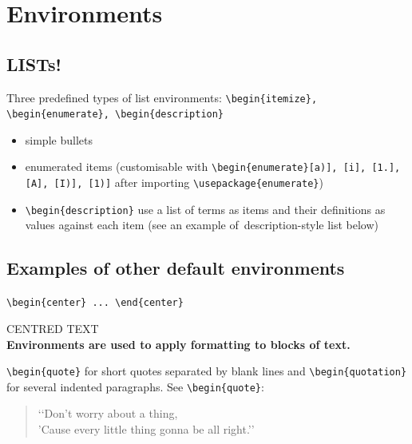 \documentclass[a4paper,11pt]{article}
\begin{document}
\section{Environments}

\subsection{LISTs!}

Three predefined types of list environments: \verb|\begin{itemize}, \begin{enumerate}, \begin{description}|

\begin{itemize}
	\item simple bullets
	\item enumerated items (customisable with \verb|\begin{enumerate}[a)], [i], [1.], [A], [I)], [1)]| after importing \verb|\usepackage{enumerate}|)
	\item \verb|\begin{description}| use a list of terms as items and their definitions as values against each item (see an example of~\hypertarget{wd:descr}{description-style list} below)
\end{itemize}

\subsection{Examples of other default environments}

\verb|\begin{center} ... \end{center}|

\begin{center}
CENTRED TEXT\\
\textbf{Environments are used to apply formatting to blocks of text.}
\end{center}

\verb|\begin{quote}| for short quotes separated by blank lines and \verb|\begin{quotation}| for several indented paragraphs. See \verb|\begin{quote}|:

\begin{quote}
	\lq\lq Don't worry about a thing,\\
	'Cause every little thing gonna be all right.\rq\rq
\end{quote}
\end{document}
